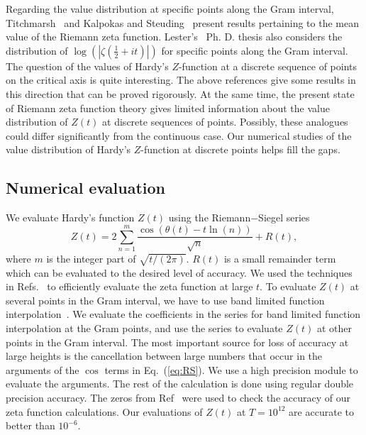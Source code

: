 \documentclass[twoside]{article}
\begin{document}
Regarding the value distribution at specific points along the Gram interval, 
Titchmarsh~\cite{Titchmarsh 1934} and Kalpokas and Steuding~\cite{kalpokas 2009} present 
results pertaining to the
mean value of the Riemann zeta function. Lester's~\cite{Lester 2013} Ph. D. thesis also 
considers the distribution of $\log (|\zeta(\frac{1}{2} + it)|)$  for specific points along the Gram interval.  
The question of the values of Hardy's $Z$-function at a discrete sequence of points on the critical axis 
is quite interesting. The above references give some results in this direction that can be proved rigorously. 
At the same time, the present state of Riemann zeta function theory gives limited information 
about the value distribution of $Z(t)$ at discrete sequences of points. Possibly, these analogues 
could differ significantly from the continuous case.  
Our numerical studies of the value distribution of Hardy's $Z$-function at discrete points
helps fill the gaps. 


\subsection{\label{numerics}Numerical evaluation}


We evaluate Hardy's function $Z(t)$  using the Riemann$-$Siegel series
\begin{equation}
Z(t) = 2\sum^{m}_{n=1}\frac{\cos(\theta(t) - t \ln (n))}{\sqrt{n}} + R(t), 
\label{eq:RS}
\end{equation}
where $m$ is the integer part of $\sqrt{t/(2\pi)}$. $R(t)$ is a small remainder
term which can be evaluated to the desired level of accuracy. We used the techniques in
 Refs.~\cite{Odlyzko 1992,hiary,gourdon} 
to efficiently evaluate the zeta function at large $t$. To evaluate  $Z(t)$  at several points 
in the Gram interval, we have to use band limited function interpolation~\cite{Jerri 1977}. 
We evaluate the coefficients in the series for band limited function interpolation at the Gram points, 
and use the series to evaluate $Z(t)$ at other points in the Gram interval. The most important 
source for loss of accuracy at large heights is the cancellation between
large numbers that occur in the arguments of the $\cos$ terms in Eq.~(\ref{eq:RS}). We 
use a high precision module to evaluate the arguments. The rest of the calculation
is done using regular double precision accuracy. The  zeros from Ref~\cite{hiary 2010} 
were used 
to check the accuracy of our zeta function calculations. 
Our evaluations of $Z(t)$ at $T=10^{12}$ 
are accurate 
to better than $10^{-6}$. 
\end{document}
